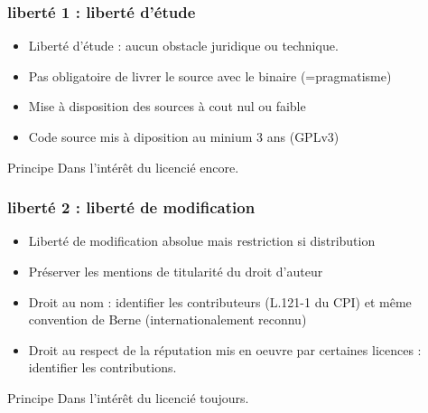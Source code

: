 \documentclass{beamer}
\begin{document}
\begin{frame} \frametitle{liberté 1 : liberté d'étude}
  \begin{itemize}
  \item Liberté d'étude : aucun obstacle juridique ou technique.
  \item Pas obligatoire de livrer le source avec le binaire
    (=pragmatisme)
  \item Mise à disposition des sources à cout nul ou faible
  \item Code source mis à diposition au minium 3 ans (GPLv3)
  \end{itemize}
  \begin{alertblock}{Principe}
    Dans l'intérêt du licencié encore.
  \end{alertblock}
\end{frame}


\begin{frame} \frametitle{liberté 2 : liberté de modification}
  \begin{itemize}
  \item Liberté de modification absolue mais restriction si
    distribution
  \item Préserver les mentions de titularité du droit d'auteur
  \item Droit au nom : identifier les contributeurs (L.121-1 du CPI)
    et même convention de Berne (internationalement reconnu)
  \item Droit au respect de la réputation mis en oeuvre par certaines
    licences : identifier les contributions.
  \end{itemize}
  \begin{alertblock}{Principe}
    Dans l'intérêt du licencié toujours.
  \end{alertblock}
\end{frame}
\end{document}
